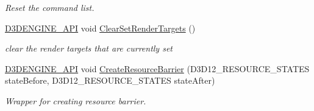 \begin{DoxyCompactItemize}
\begin{DoxyCompactList}\small\item\em Reset the command list. \end{DoxyCompactList}\item 
\mbox{\hyperlink{stdafx_8h_a8ee2d990c5dfba7794dd2b60741d7722}{D3\+D\+E\+N\+G\+I\+N\+E\+\_\+\+A\+PI}} void \mbox{\hyperlink{class_command_list_manager_adbe4e0341431cc06d195dd2172f124a9}{Clear\+Set\+Render\+Targets}} ()
\begin{DoxyCompactList}\small\item\em clear the render targets that are currently set \end{DoxyCompactList}\item 
\mbox{\hyperlink{stdafx_8h_a8ee2d990c5dfba7794dd2b60741d7722}{D3\+D\+E\+N\+G\+I\+N\+E\+\_\+\+A\+PI}} void \mbox{\hyperlink{class_command_list_manager_a9c43dd47ed27bb96d59dcfc044f36d07}{Create\+Resource\+Barrier}} (D3\+D12\+\_\+\+R\+E\+S\+O\+U\+R\+C\+E\+\_\+\+S\+T\+A\+T\+ES state\+Before, D3\+D12\+\_\+\+R\+E\+S\+O\+U\+R\+C\+E\+\_\+\+S\+T\+A\+T\+ES state\+After)
\begin{DoxyCompactList}\small\item\em Wrapper for creating resource barrier. \end{DoxyCompactList}\end{DoxyCompactItemize}

